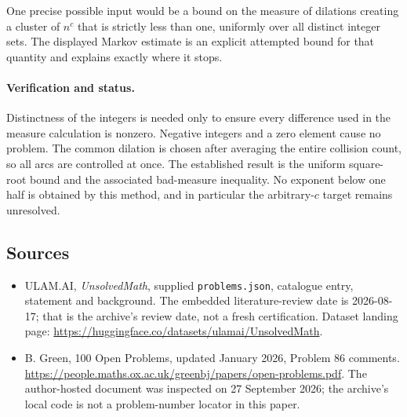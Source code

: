 \documentclass[11pt,a4paper]{article}
\begin{document}
One precise possible input would be a bound on the measure of dilations creating a cluster of $n^c$ that is strictly less than one, uniformly over all distinct integer sets. The displayed Markov estimate is an explicit attempted bound for that quantity and explains exactly where it stops.

\paragraph{Verification and status.}
Distinctness of the integers is needed only to ensure every difference used in the measure calculation is nonzero. Negative integers and a zero element cause no problem. The common dilation is chosen after averaging the entire collision count, so all arcs are controlled at once. The established result is the uniform square-root bound and the associated bad-measure inequality. No exponent below one half is obtained by this method, and in particular the arbitrary-$c$ target remains unresolved.

\subsection{Sources}

{\small

\begin{itemize}

\item[\hypertarget{source:statement:1}{S1}] ULAM.AI, \emph{UnsolvedMath}, supplied \texttt{problems.json}, catalogue entry, statement and background. The embedded literature-review date is 2026-08-17; that is the archive’s review date, not a fresh certification. Dataset landing page: \url{https://huggingface.co/datasets/ulamai/UnsolvedMath}.

\item[\hypertarget{source:statement:2}{S2}] B. Green, 100 Open Problems, updated January 2026, Problem 86 comments. \url{https://people.maths.ox.ac.uk/greenbj/papers/open-problems.pdf}. The author-hosted document was inspected on 27 September 2026; the archive’s local code is not a problem-number locator in this paper.

\end{itemize}

}

\label{end:statement}
\end{document}
